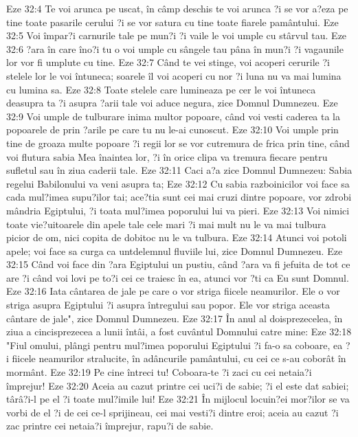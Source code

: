 Eze 32:4  Te voi arunca pe uscat, în câmp deschis te voi arunca ?i se vor a?eza pe tine toate pasarile cerului ?i se vor satura cu tine toate fiarele pamântului.
Eze 32:5  Voi împar?i carnurile tale pe mun?i ?i vaile le voi umple cu stârvul tau.
Eze 32:6  ?ara în care îno?i tu o voi umple cu sângele tau pâna în mun?i ?i vagaunile lor vor fi umplute cu tine.
Eze 32:7  Când te vei stinge, voi acoperi cerurile ?i stelele lor le voi întuneca; soarele îl voi acoperi cu nor ?i luna nu va mai lumina cu lumina sa.
Eze 32:8  Toate stelele care lumineaza pe cer le voi întuneca deasupra ta ?i asupra ?arii tale voi aduce negura, zice Domnul Dumnezeu.
Eze 32:9  Voi umple de tulburare inima multor popoare, când voi vesti caderea ta la popoarele de prin ?arile pe care tu nu le-ai cunoscut.
Eze 32:10  Voi umple prin tine de groaza multe popoare ?i regii lor se vor cutremura de frica prin tine, când voi flutura sabia Mea înaintea lor, ?i în orice clipa va tremura fiecare pentru sufletul sau în ziua caderii tale.
Eze 32:11  Caci a?a zice Domnul Dumnezeu: Sabia regelui Babilonului va veni asupra ta;
Eze 32:12  Cu sabia razboinicilor voi face sa cada mul?imea supu?ilor tai; ace?tia sunt cei mai cruzi dintre popoare, vor zdrobi mândria Egiptului, ?i toata mul?imea poporului lui va pieri.
Eze 32:13  Voi nimici toate vie?uitoarele din apele tale cele mari ?i mai mult nu le va mai tulbura picior de om, nici copita de dobitoc nu le va tulbura.
Eze 32:14  Atunci voi potoli apele; voi face sa curga ca untdelemnul fluviile lui, zice Domnul Dumnezeu.
Eze 32:15  Când voi face din ?ara Egiptului un pustiu, când ?ara va fi jefuita de tot ce are ?i când voi lovi pe to?i cei ce traiesc în ea, atunci vor ?ti ca Eu sunt Domnul.
Eze 32:16  Iata cântarea de jale pe care o vor striga fiicele neamurilor. Ele o vor striga asupra Egiptului ?i asupra întregului sau popor. Ele vor striga aceasta cântare de jale", zice Domnul Dumnezeu.
Eze 32:17  În anul al doisprezecelea, în ziua a cincisprezecea a lunii întâi, a fost cuvântul Domnului catre mine:
Eze 32:18  "Fiul omului, plângi pentru mul?imea poporului Egiptului ?i fa-o sa coboare, ea ?i fiicele neamurilor stralucite, în adâncurile pamântului, cu cei ce s-au coborât în mormânt.
Eze 32:19  Pe cine întreci tu! Coboara-te ?i zaci cu cei netaia?i împrejur!
Eze 32:20  Aceia au cazut printre cei uci?i de sabie; ?i el este dat sabiei; târâ?i-l pe el ?i toate mul?imile lui!
Eze 32:21  În mijlocul locuin?ei mor?ilor se va vorbi de el ?i de cei ce-l sprijineau, cei mai vesti?i dintre eroi; aceia au cazut ?i zac printre cei netaia?i împrejur, rapu?i de sabie.
